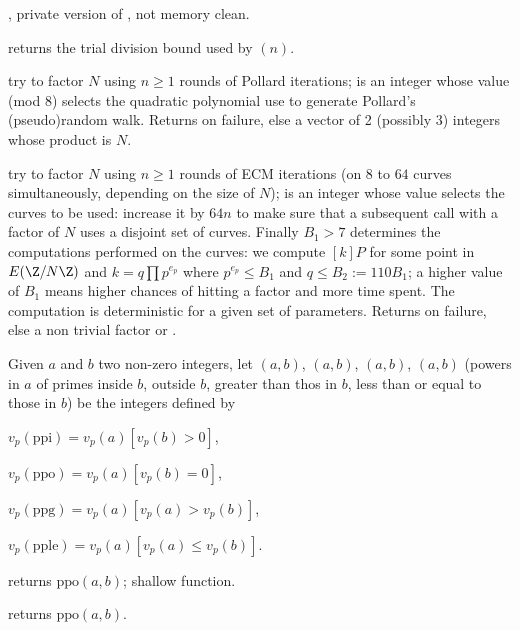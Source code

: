 , private version of
, not memory clean.

 returns the trial division bound used by
$(n)$.

 try to factor
 $N$ using $n\geq 1$ rounds of Pollard iterations;  is an
integer whose value (mod $8$) selects the quadratic polynomial use to
generate Pollard's (pseudo)random walk. Returns  on failure, else a
vector of 2 (possibly 3) integers whose product is $N$.

 try to
factor  $N$ using $n\geq 1$ rounds of ECM iterations (on $8$ to $64$
curves simultaneously, depending on the size of $N$);  is an
integer whose value selects the curves to be used: increase it by $64n$ to
make sure that a subsequent call with a factor of $N$ uses a disjoint set of
curves.
Finally $B_1 > 7$ determines the computations performed on the
curves: we compute $[k]P$ for some point in $E(\Z/N\Z)$ and $k = q \prod
p^{e_p}$ where $p^{e_p} \leq B_1$ and $q \leq B_2 := 110 B_1$; a higher value
of $B_1$ means higher chances of hitting a factor and more time spent.
The computation is deterministic for a given set of parameters. Returns
 on failure, else a non trivial factor or .


Given $a$ and $b$ two non-zero integers, let $(a,b)$, $(a,b)$,
$(a,b)$, $(a,b)$ (powers in $a$ of primes inside $b$,
outside $b$, greater than thos in $b$, less than or equal to those in $b$) be
the integers defined by

\item $v_p(\text{ppi}) = v_p(a) [v_p(b) > 0]$,

\item $v_p(\text{ppo}) = v_p(a) [v_p(b) = 0]$,

\item $v_p(\text{ppg}) = v_p(a) [v_p(a) > v_p(b)]$,

\item $v_p(\text{pple}) = v_p(a) [v_p(a) \leq v_p(b)]$.

 returns $\text{ppo}(a,b)$; shallow function.

 returns $\text{ppo}(a,b)$.


